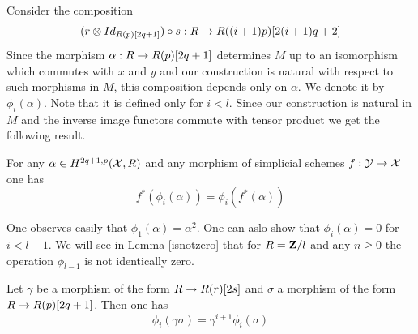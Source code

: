 \documentclass[11pt]{article}
\begin{document}
%
%
Consider the composition 
%
$$(r\otimes Id_{{{R}}(p)[2q+1]})\circ s:{{R}}\rightarrow {{R}}((i+1)p)[2(i+1)q+2]$$
%
Since the morphism $\alpha:{{R}}\rightarrow{{R}}(p)[2q+1]$ determines $M$ up to an
isomorphism which commutes with $x$ and $y$ and our construction is
natural with respect to such morphisms in $M$, this composition
depends only on $\alpha$. We denote it by $\phi_i(\alpha)$. Note that
it is defined only for $i<l$. Since our construction is natural in $M$
and the inverse image functors commute with tensor product we get the
following result.
%
\begin{lemma}
For any $\alpha\in H^{2q+1,p}({\cal X},R)$ and any morphism of
simplicial schemes $f:{\cal Y}\rightarrow {\cal X}$ one has
%
$$f^*(\phi_i(\alpha))=\phi_i(f^*(\alpha))$$
%
\end{lemma}
%
\begin{remark}\rm
One observes easily that $\phi_1(\alpha)=\alpha^2$. One can aslo show
that $\phi_i(\alpha)=0$ for $i<l-1$. We will see in Lemma
\ref{isnotzero} that for $R={\bf Z\rm}/l$ and any $n\ge 0$ the operation
$\phi_{l-1}$ is not identically zero.
\end{remark}
%
\begin{proposition}
Let $\gamma$ be a morphism of the form ${{R}}\rightarrow{{R}}(r)[2s]$ and
$\sigma$ a morphism of the form ${{R}}\rightarrow{{R}}(p)[2q+1]$. Then one has
%
$$\phi_i(\gamma\sigma)=\gamma^{i+1}\phi_i(\sigma)$$
%
\end{proposition}
%
\end{document}
